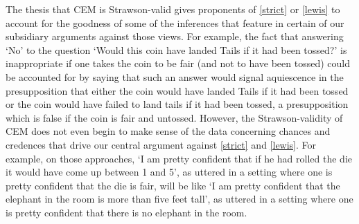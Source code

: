 \documentclass[leqno, 11pt, a5paper, openany]{article}
\begin{document}
The thesis that CEM is Strawson-valid gives proponents of \ref{strict} or \ref{lewis} to account for the goodness of some of the inferences that feature in certain of our subsidiary arguments against those views.  For example, the fact that answering ‘No’ to the question ‘Would this coin have landed Tails if it had been tossed?’ is inappropriate if one takes the coin to be fair (and not to have been tossed) could be accounted for by saying that such an answer would signal aquiescence in the presupposition that either the coin would have landed Tails if it had been tossed or the coin would have failed to land tails if it had been tossed, a presupposition which is false if the coin is fair and untossed.  However, the Strawson-validity of CEM does not even begin to make sense of the data concerning chances and credences that drive our central argument against \ref{strict} and \ref{lewis}.  For example, on those approaches, ‘I am pretty confident that if he had rolled the die it would have come up between 1 and 5’, as uttered in a setting where one is pretty confident that the die is fair, will be like ‘I am pretty confident that the elephant in the room is more than five feet tall’, as uttered in a setting where one is pretty confident that there is no elephant in the room.  
\end{document}
